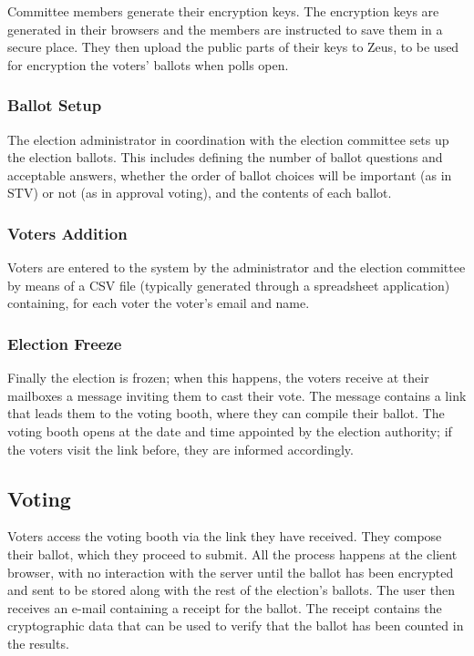 \documentclass[letterpaper,10pt]{article}
\begin{document}
Committee members generate their encryption keys. The encryption keys
are generated in their browsers and the members are instructed to save
them in a secure place. They then upload the public parts of their
keys to Zeus, to be used for encryption the voters' ballots when polls
open. 

\subsubsection{Ballot Setup}

The election administrator in coordination with the election committee
sets up the election ballots. This includes defining the number of
ballot questions and acceptable answers, whether the order of ballot
choices will be important (as in STV) or not (as in approval voting),
and the contents of each ballot.

\subsubsection{Voters Addition}

Voters are entered to the system by the administrator and the election
committee by means of a CSV file (typically generated through a
spreadsheet application) containing, for each voter the voter's email
and name.

\subsubsection{Election Freeze}

Finally the election is frozen; when this happens, the voters receive
at their mailboxes a message inviting them to cast their vote. The
message contains a link that leads them to the voting booth, where
they can compile their ballot. The voting booth opens at the date and
time appointed by the election authority; if the voters visit the link
before, they are informed accordingly.

\subsection{Voting}

Voters access the voting booth via the link they have received. They
compose their ballot, which they proceed to submit. All the process
happens at the client browser, with no interaction with the server
until the ballot has been encrypted and sent to be stored along with
the rest of the election's ballots. The user then receives an e-mail
containing a receipt for the ballot. The receipt contains the
cryptographic data that can be used to verify that the ballot has been
counted in the results.
\end{document}
